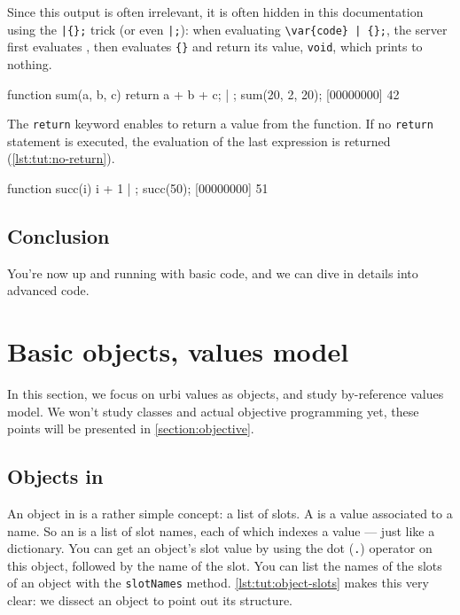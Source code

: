 Since this output is often irrelevant, it is often hidden in this
documentation using the \lstinline'|{};' trick (or even
\lstinline'|;'): when evaluating \lstinline'\var{code} | {};', the
server first evaluates , then evaluates \lstinline'{}' and
return its value, \lstinline'void', which prints to nothing.

\begin{urbiscript}[caption=Function with arguments,label=lst:tut:function-arg]
function sum(a, b, c)
{
  return a + b + c;
} | {};
sum(20, 2, 20);
[00000000] 42
\end{urbiscript}

The \lstinline{return} keyword enables to return a value from the
function. If no \lstinline{return} statement is executed, the
evaluation of the last expression is returned
(\autoref{lst:tut:no-return}).

\begin{urbiscript}[caption=Return value is the last evaluated value,
  label=lst:tut:no-return]
function succ(i) { i + 1 } | {};
succ(50);
[00000000] 51
\end{urbiscript}

\section{Conclusion}

You're now up and running with basic \us code, and we can dive in
details into advanced \us code.

\chapter{Basic objects, \us values model} %

In this section, we focus on urbi values as objects, and study \us
by-reference values model. We won't study classes and actual objective
programming yet, these points will be presented in
\autoref{section:objective}.

\section{Objects in \us}
\label{sec:tut:objects}
An object in \us is a rather simple concept: a list of slots. A
 is a value associated to a name. So an  is a
list of slot names, each of which indexes a value --- just like a
dictionary. You can get an object's slot value by using the dot
(\lstinline{.}) operator on this object, followed by the name of the
slot. You can list the names of the slots of an object with the
\lstinline{slotNames} method. \autoref{lst:tut:object-slots} makes
this very clear: we dissect an object to point out its structure.

